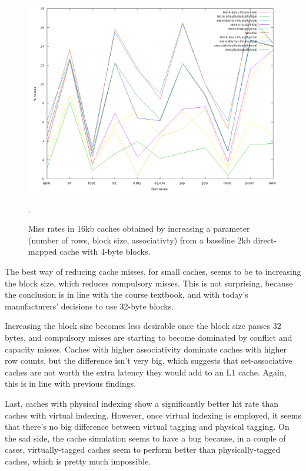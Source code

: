 \begin{figure}[htb]
  \includegraphics[width=6.8in]{6.823/lab2/figs/ccc_16k.png}
  \caption{Miss rates in 16kb caches obtained by increasing a parameter
  (number of rows, block size, associativty) from a baseline 2kb direct-mapped
  cache with 4-byte blocks.} \label{q1:16k}.
\end{figure}

The best way of reducing cache misses, for small caches, seems to be to
increasing the block size, which reduces compulsory misses. This is not
surprising, because the conclusion is in line with the course textbook, and
with today's manufacturers' decisions to use 32-byte blocks.

Increasing the block size becomes less desirable once the block size passes 32
bytes, and compulsory misses are starting to become dominated by conflict and
capacity misses. Caches with higher associativity dominate caches with higher
row counts, but the difference isn't very big, which suggests that
set-associative caches are not worth the extra latency they would add to an L1
cache. Again, this is in line with previous findings.

Last, caches with physical indexing show a significantly better hit rate than
caches with virtual indexing. However, once virtual indexing is employed, it
seems that there's no big difference between virtual tagging and physical
tagging. On the sad side, the cache simulation seems to have a bug because, in a
couple of cases, virtually-tagged caches seem to perform better than
physically-tagged caches, which is pretty much impossible.

